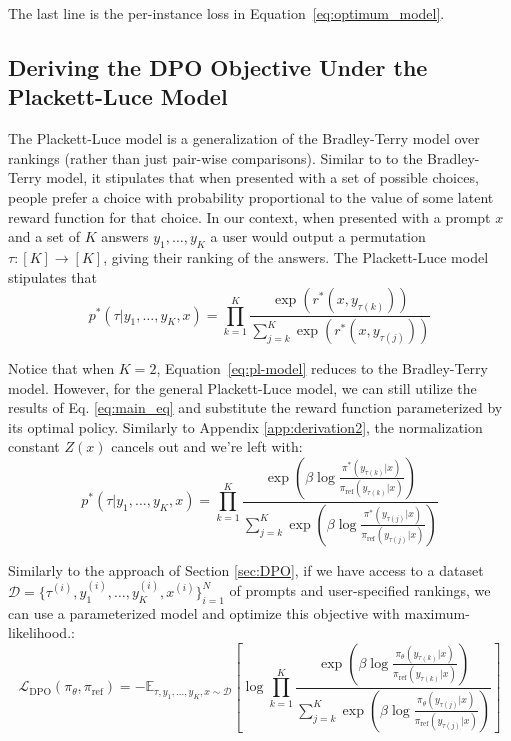 \documentclass{article}
\newcommand{\piref}{\pi_\text{ref}}
\begin{document}
The last line is the per-instance loss in Equation~\ref{eq:optimum_model}.


\subsection{Deriving the DPO Objective Under the Plackett-Luce Model}
\label{app:plackett_luce_models}
The Plackett-Luce model \citep{plackett1975analysis, luce2012individual} is a generalization of the Bradley-Terry model over rankings (rather than just pair-wise comparisons). Similar to to the Bradley-Terry model, it stipulates that when presented with a set of possible choices, people prefer a choice with probability proportional to the value of some latent reward function for that choice. In our context, when presented with a prompt $x$ and a set of $K$ answers $y_1, \ldots, y_K$ a user would output a permutation $\tau:[K]\to[K]$, giving their ranking of the answers. The Plackett-Luce model stipulates that
\begin{equation}\label{eq:pl-model}
    p^*(\tau| y_1,\ldots, y_K, x)= \prod_{k=1}^{K}\frac{\exp(r^*(x, y_{\tau(k)}))}{\sum_{j=k}^{K}\exp(r^*(x, y_{\tau(j)}))}
\end{equation}

Notice that when $K=2$, Equation~\ref{eq:pl-model} reduces to the Bradley-Terry model. However, for the general Plackett-Luce model, we can still utilize the results of Eq. \ref{eq:main_eq} and substitute the reward function parameterized by its optimal policy. Similarly to Appendix \ref{app:derivation2}, the normalization constant $Z(x)$ cancels out and we're left with:
\begin{equation}
    p^*(\tau| y_1,\ldots, y_K, x)= \prod_{k=1}^{K}\frac{\exp\left(\beta \log \frac{\pi^*(y_{\tau(k)}|x)}{\piref(y_{\tau(k)}|x)}\right)}{\sum_{j=k}^{K}\exp\left(\beta \log \frac{\pi^*(y_{\tau(j)}|x)}{\piref(y_{\tau(j)}|x)}\right)}
\end{equation}

Similarly to the approach of Section \ref{sec:DPO}, if we have access to a dataset $\mathcal{D} = \{\tau^{(i)}, y_1^{(i)}, \ldots, y_K^{(i)}, x^{(i)}\}_{i=1}^N$ of prompts and user-specified rankings, we can use a parameterized model and optimize this objective with maximum-likelihood.:
\begin{equation}
    \mathcal{L}_{\text{DPO}}(\pi_{\theta}, \piref) = -\mathbb{E}_{\tau, y_1, \ldots, y_K, x\sim\mathcal{D}}\left[\log \prod_{k=1}^{K}\frac{\exp\left(\beta \log \frac{\pi_{\theta}(y_{\tau(k)}|x)}{\piref(y_{\tau(k)}|x)}\right)}{\sum_{j=k}^{K}\exp\left(\beta \log \frac{\pi_{\theta}(y_{\tau(j)}|x)}{\piref(y_{\tau(j)}|x)}\right)}\right]
\end{equation}
\end{document}

